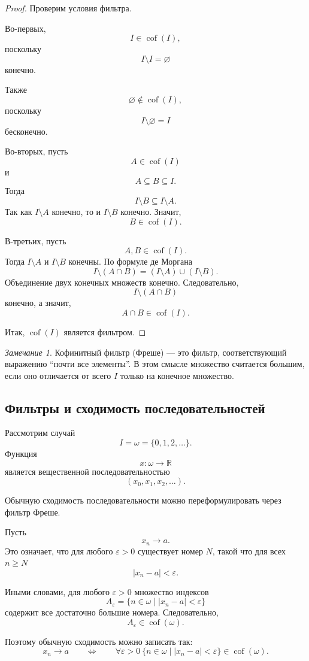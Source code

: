 \documentclass[12pt,a4paper,oneside,openany]{book}
\theoremstyle{definition}
\theoremstyle{plain}
\theoremstyle{remark}
\newtheorem{remark}{Замечание}[chapter]
\begin{document}
\begin{proof}
Проверим условия фильтра.

Во-первых,
\[
I\in\operatorname{cof}(I),
\]
поскольку
\[
I\setminus I=\varnothing
\]
конечно.

Также
\[
\varnothing\notin\operatorname{cof}(I),
\]
поскольку
\[
I\setminus\varnothing=I
\]
бесконечно.

Во-вторых, пусть
\[
A\in\operatorname{cof}(I)
\]
и
\[
A\subseteq B\subseteq I.
\]
Тогда
\[
I\setminus B\subseteq I\setminus A.
\]
Так как $I\setminus A$ конечно, то и $I\setminus B$ конечно. Значит,
\[
B\in\operatorname{cof}(I).
\]

В-третьих, пусть
\[
A,B\in\operatorname{cof}(I).
\]
Тогда $I\setminus A$ и $I\setminus B$ конечны. По формуле де Моргана
\[
I\setminus(A\cap B)
=
(I\setminus A)\cup(I\setminus B).
\]
Объединение двух конечных множеств конечно. Следовательно,
\[
I\setminus(A\cap B)
\]
конечно, а значит,
\[
A\cap B\in\operatorname{cof}(I).
\]

Итак, $\operatorname{cof}(I)$ является фильтром.
\end{proof}

\begin{remark}
Кофинитный фильтр (Фреше) — это фильтр, соответствующий выражению ``почти все элементы''. В этом смысле множество считается большим, если оно отличается от всего $I$ только на конечное множество.
\end{remark}

\subsection{Фильтры и сходимость последовательностей}

Рассмотрим случай
\[
I=\omega=\{0,1,2,\ldots\}.
\]
Функция
\[
x:\omega\to\mathbb R
\]
является вещественной последовательностью
\[
(x_0,x_1,x_2,\ldots).
\]

Обычную сходимость последовательности можно переформулировать через фильтр Фреше.

Пусть
\[
x_n\to a.
\]
Это означает, что для любого $\varepsilon>0$ существует номер $N$, такой что для всех $n\ge N$
\[
|x_n-a|<\varepsilon.
\]

Иными словами, для любого $\varepsilon>0$ множество индексов
\[
A_\varepsilon
=
\{n\in\omega\mid |x_n-a|<\varepsilon\}
\]
содержит все достаточно большие номера. Следовательно,
\[
A_\varepsilon\in\operatorname{cof}(\omega).
\]

Поэтому обычную сходимость можно записать так:
\[
x_n\to a
\qquad
\Longleftrightarrow
\qquad
\forall\varepsilon>0\ 
\{n\in\omega\mid |x_n-a|<\varepsilon\}\in\operatorname{cof}(\omega).
\]
\end{document}
